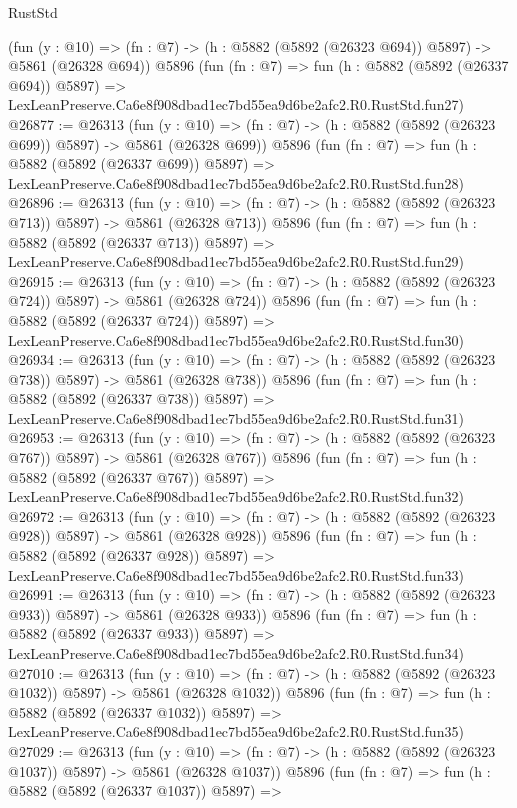 \begin{lexlean}{RustStd}
\begin{coremodule}
    (fun (y : @10) => (fn : @7) -> (h : @5882 (@5892 (@26323 @694)) @5897) -> @5861 (@26328 @694))
    @5896
    (fun (fn : @7) =>
    fun (h : @5882 (@5892 (@26337 @694)) @5897) =>
    LexLeanPreserve.Ca6e8f908dbad1ec7bd55ea9d6be2afc2.R0.RustStd.fun27)
@26877 := @26313
    (fun (y : @10) => (fn : @7) -> (h : @5882 (@5892 (@26323 @699)) @5897) -> @5861 (@26328 @699))
    @5896
    (fun (fn : @7) =>
    fun (h : @5882 (@5892 (@26337 @699)) @5897) =>
    LexLeanPreserve.Ca6e8f908dbad1ec7bd55ea9d6be2afc2.R0.RustStd.fun28)
@26896 := @26313
    (fun (y : @10) => (fn : @7) -> (h : @5882 (@5892 (@26323 @713)) @5897) -> @5861 (@26328 @713))
    @5896
    (fun (fn : @7) =>
    fun (h : @5882 (@5892 (@26337 @713)) @5897) =>
    LexLeanPreserve.Ca6e8f908dbad1ec7bd55ea9d6be2afc2.R0.RustStd.fun29)
@26915 := @26313
    (fun (y : @10) => (fn : @7) -> (h : @5882 (@5892 (@26323 @724)) @5897) -> @5861 (@26328 @724))
    @5896
    (fun (fn : @7) =>
    fun (h : @5882 (@5892 (@26337 @724)) @5897) =>
    LexLeanPreserve.Ca6e8f908dbad1ec7bd55ea9d6be2afc2.R0.RustStd.fun30)
@26934 := @26313
    (fun (y : @10) => (fn : @7) -> (h : @5882 (@5892 (@26323 @738)) @5897) -> @5861 (@26328 @738))
    @5896
    (fun (fn : @7) =>
    fun (h : @5882 (@5892 (@26337 @738)) @5897) =>
    LexLeanPreserve.Ca6e8f908dbad1ec7bd55ea9d6be2afc2.R0.RustStd.fun31)
@26953 := @26313
    (fun (y : @10) => (fn : @7) -> (h : @5882 (@5892 (@26323 @767)) @5897) -> @5861 (@26328 @767))
    @5896
    (fun (fn : @7) =>
    fun (h : @5882 (@5892 (@26337 @767)) @5897) =>
    LexLeanPreserve.Ca6e8f908dbad1ec7bd55ea9d6be2afc2.R0.RustStd.fun32)
@26972 := @26313
    (fun (y : @10) => (fn : @7) -> (h : @5882 (@5892 (@26323 @928)) @5897) -> @5861 (@26328 @928))
    @5896
    (fun (fn : @7) =>
    fun (h : @5882 (@5892 (@26337 @928)) @5897) =>
    LexLeanPreserve.Ca6e8f908dbad1ec7bd55ea9d6be2afc2.R0.RustStd.fun33)
@26991 := @26313
    (fun (y : @10) => (fn : @7) -> (h : @5882 (@5892 (@26323 @933)) @5897) -> @5861 (@26328 @933))
    @5896
    (fun (fn : @7) =>
    fun (h : @5882 (@5892 (@26337 @933)) @5897) =>
    LexLeanPreserve.Ca6e8f908dbad1ec7bd55ea9d6be2afc2.R0.RustStd.fun34)
@27010 := @26313
    (fun (y : @10) => (fn : @7) -> (h : @5882 (@5892 (@26323 @1032)) @5897) -> @5861 (@26328 @1032))
    @5896
    (fun (fn : @7) =>
    fun (h : @5882 (@5892 (@26337 @1032)) @5897) =>
    LexLeanPreserve.Ca6e8f908dbad1ec7bd55ea9d6be2afc2.R0.RustStd.fun35)
@27029 := @26313
    (fun (y : @10) => (fn : @7) -> (h : @5882 (@5892 (@26323 @1037)) @5897) -> @5861 (@26328 @1037))
    @5896
    (fun (fn : @7) =>
    fun (h : @5882 (@5892 (@26337 @1037)) @5897) =>

\end{coremodule}
\end{lexlean}

